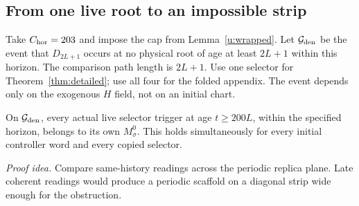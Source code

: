\subsection{From one live root to an impossible strip}
Take \(C_{\rm hor}=203\) and impose the cap from
Lemma~\ref{u:wrapped}. Let \(\mathcal G_{\rm den}\) be the event that \(D_{2L+1}\) occurs at no physical root of age at least \(2L+1\) within this horizon. The comparison path length is \(2L+1\).
Use one selector for Theorem~\ref{thm:detailed}; use all four for the folded appendix. The event depends only on the
exogenous \(H\) field, not on an initial chart.

\begin{proposition}\label{u:mortality}
On \(\mathcal G_{\rm den}\), every actual live selector trigger at age
\(t\ge200L\), within the specified horizon, belongs to its own \(M^0_\sigma\).
This holds simultaneously for every initial controller word and every
copied selector.
\end{proposition}
\par\noindent\emph{Proof idea.} Compare same-history readings across the periodic replica plane. Late coherent readings would produce a periodic scaffold on a diagonal strip wide enough for the obstruction.

